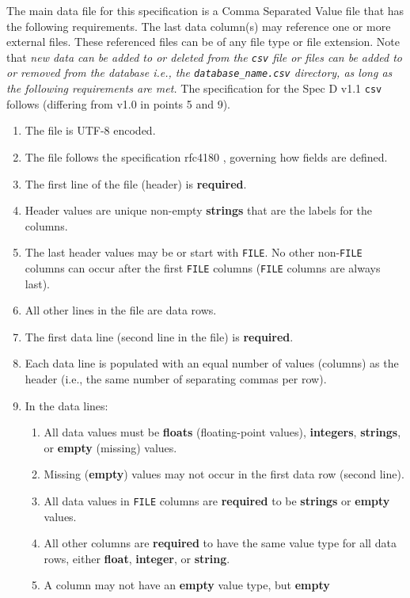 The main data file for this specification is a Comma Separated Value file that
has the following requirements.  The last data column(s) may reference one or
more external files. These referenced files can be of any file type or file
extension.  Note that \textit{new data can be added to or deleted from the
\texttt{\small csv} file or files can be added to or removed from the database
i.e., the \texttt{\small database\_name.csv} directory, as long as the 
following requirements are met.} The specification for the Spec D v1.1
\texttt{\small csv} follows (differing from v1.0 in points 5 and 9).

\begin{enumerate}
\item The file is UTF-8 encoded.
\item The file follows the specification rfc4180 \cite{rfc4180}, governing how
fields are defined.
\item The first line of the file (header) is \textbf{required}.  
\item Header values are unique non-empty \textbf{strings} that are the labels 
for the columns.
\item The last header values may be or start with \texttt{\small FILE}. No 
other non-\texttt{\small FILE} columns can occur after the first
\texttt{\small FILE} columns (\texttt{\small FILE} columns are always last). 
\item All other lines in the file are data rows.
\item The first data line (second line in the file) is \textbf{required}.
\item Each data line is populated with an equal number of values
(columns) as the header (i.e., the same number of separating commas per row).
\item In the data lines:
\begin{enumerate}
\item All data values must be \textbf{floats} (floating-point values), 
\textbf{integers}, \textbf{strings}, or \textbf{empty} (missing) values.
\item Missing (\textbf{empty}) values may not occur in the first data row 
(second line).
\item All data values in \texttt{\small FILE} columns are \textbf{required}
to be \textbf{strings} or \textbf{empty} values.
\item All other columns are \textbf{required} to have the same value type for
all data rows, either \textbf{float}, \textbf{integer}, or \textbf{string}.
\item A column may not have an \textbf{empty} value type, but \textbf{empty} 

\end{enumerate}
\end{enumerate}
